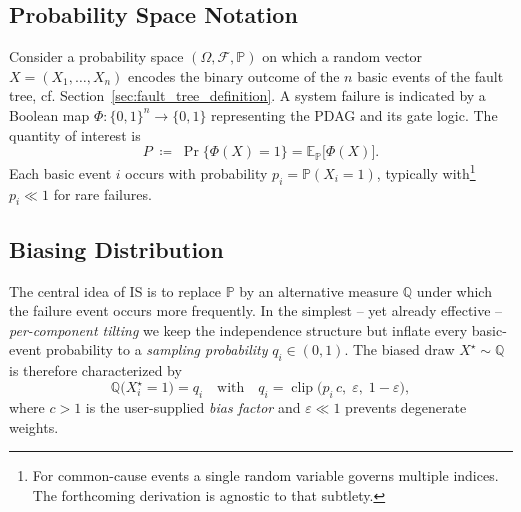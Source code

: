 \subsection{Probability Space Notation}
Consider a probability space \((\Omega,\mathcal{F},\mathbb{P})\) on which a
random vector \(X=(X_{1},\dots,X_{n})\) encodes the binary outcome of the
\(n\) basic events of the fault tree, cf.
Section~\ref{sec:fault_tree_definition}.  A system failure is
indicated by a Boolean map \(\Phi:\{0,1\}^{n}\to\{0,1\}\) representing the
PDAG and its gate logic.  The quantity of interest is
\begin{equation}
  P\;\coloneqq\;\Pr\bigl\{\Phi(X)=1\bigr\}=\mathbb{E}_{\mathbb{P}}\bigl[\Phi(X)\bigr].
  \label{eq:is:true-prob}
\end{equation}
Each basic event \(i\) occurs with probability
\(p_{i}=\mathbb{P}(X_{i}=1)\), typically with\footnote{For common-cause events
a single random variable governs multiple indices.  The forthcoming derivation
is agnostic to that subtlety.}
\(p_{i}\ll1\) for rare failures.

\subsection{Biasing Distribution}
The central idea of IS is to replace \(\mathbb{P}\) by an alternative measure
\(\mathbb{Q}\) under which the failure event occurs more frequently.  In the
simplest – yet already effective – \emph{per-component tilting} we keep the
independence structure but inflate every basic-event probability to a
\emph{sampling probability} \(q_{i}\in(0,1)\).  The biased draw
\(X^{\star}\sim\mathbb{Q}\) is therefore characterized by
\begin{equation}
  \mathbb{Q}\bigl(X^{\star}_{i}=1\bigr)=q_{i}
  \quad\text{with}\quad
  q_{i}=\operatorname{clip}\bigl(p_{i}\,c,\;\varepsilon,\;1-\varepsilon\bigr),
  \label{eq:is:tilt}
\end{equation}
where \(c>1\) is the user-supplied \emph{bias factor} and
\(\varepsilon\ll1\) prevents degenerate weights.

